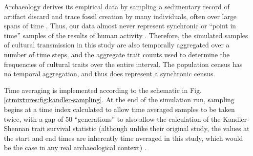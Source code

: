 Archaeology derives its empirical data by sampling a sedimentary record of artifact discard and trace fossil creation by many individuals, often over large spans of time \citep{schiffer1983toward,Schiffer1987,stein2001review,Stein1987,Stein1993,stein2001review,stein2003big}.  Thus, our data almost never represent synchronic or ``point in time'' samples of the results of human activity \citep{Grayson1998,lyman2003influence,Madsen2012,Porvcic2014,Premo2014}.  Therefore, the simulated samples of cultural transmission in this study are also temporally aggregated over a number of time steps, and the aggregate trait counts used to determine the frequencies of cultural traits over the entire interval.  The population census has no temporal aggregation, and thus does represent a synchronic census.  

Time averaging is implemented according to the schematic in Fig. \ref{ctmixtures:fig:kandler-sampling}.  At the end of the simulation run, sampling begins at a time index calculated to allow time averaged samples to be taken twice, with a gap of 50 ``generations'' to also allow the calculation of the Kandler-Shennan trait survival statistic (although unlike their original study, the values at the start and end times are inherently time averaged in this study, which would be the case in any real archaeological context) \citep{Kandler2013}.

